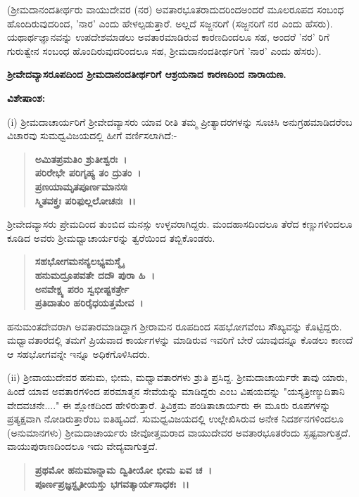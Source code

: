 (ಶ‍್ರೀಮದಾನಂದತೀರ್ಥರು ವಾಯುದೇವರ (ನರ) ಅವತಾರಭೂತರಾದುದರಿಂದ\break ಅಂದರೆ ಮೂಲರೂಪದ ಸಂಬಂಧ ಹೊಂದಿರುವುದರಿಂದ, 'ನಾರ' ಎಂದು ಹೇಳಲ್ಪಡುತ್ತಾರೆ. ಅಲ್ಲದೆ ಸಜ್ಜನರಿಗೆ (ಸಜ್ಜನರಿಗೆ ನರ ಎಂದು ಹೆಸರು). ಯಥಾರ್ಥಜ್ಞಾನವನ್ನು ಉಪದೇಶಮಾಡಲು ಅವತಾರಮಾಡಿರುವ ಕಾರಣದಿಂದಲೂ ಸಹ, ಅಂದರೆ 'ನರ' ರಿಗೆ ಗುರುತ್ವೇನ ಸಂಬಂಧ ಹೊಂದಿರುವುದರಿಂದಲೂ ಸಹ, ಶ‍್ರೀಮದಾನಂದತೀರ್ಥರಿಗೆ 'ನಾರ' ಎಂದು ಹೆಸರು).

\begin{center}
\textbf{ಶ‍್ರೀವೇದವ್ಯಾಸರೂಪದಿಂದ ಶ‍್ರೀಮದಾನಂದತೀರ್ಥರಿಗೆ ಆಶ್ರಯನಾದ ಕಾರಣದಿಂದ ನಾರಾಯಣ.}
\end{center}

\noindent
\textbf{ವಿಶೇಷಾಂಶ:\enginline{-}}

(i) ಶ‍್ರೀಮದಾಚಾರ್ಯರಿಗೆ ಶ‍್ರೀವೇದವ್ಯಾಸರು ಯಾವ ರೀತಿ ತಮ್ಮ ಪ್ರೀತ್ಯಾದರಗಳನ್ನು ಸೂಚಿಸಿ ಅನುಗ್ರಹಮಾಡಿದರೆಂಬ ವಿಚಾರವು ಸುಮಧ್ವವಿಜಯದಲ್ಲಿ ಹೀಗೆ ವರ್ಣಿಸಲಾಗಿದೆ:-

\begin{verse}
\textbf{ಅಮಿತಪ್ರಮತಿಂ ಶ್ರುತೀಶ್ವರಃ~।}\\\textbf{ಪರಿರೇಭೇ ಪರಿಗೃಹ್ಯ ತಂ ದ್ರುತಂ~।}\\\textbf{ಪ್ರಣಯಾಮೃತಪೂರ್ಣಮಾನಸಃ}\\\textbf{ಸ್ಮಿತವಕ್ತ್ರಃ ಪರಿಫುಲ್ಲಲೋಚನಃ~।।}
\end{verse}

ಶ‍್ರೀವೇದವ್ಯಾಸರು ಪ್ರೇಮದಿಂದ ತುಂಬಿದ ಮನಸ್ಸು ಉಳ್ಳವರಾಗಿದ್ದರು. ಮಂದಹಾಸದಿಂದಲೂ ತೆರೆದ ಕಣ್ಣುಗಳಿಂದಲೂ ಕೂಡಿದ ಅವರು ಶ‍್ರೀಮಧ್ವಾಚಾರ್ಯರನ್ನು ತ್ವರೆಯಿಂದ ತಬ್ಬಿಕೊಂಡರು.

\begin{verse}
\textbf{ಸಹಭೋಗಮನನ್ಯಲಭ್ಯಮಸ್ಮೈ}\\\textbf{ಹನುಮದ್ರೂಪವತೇ ದದೌ ಪುರಾ ಹಿ~।}\\\textbf{ಅನವೇಕ್ಷ್ಯ ಪರಂ ಸ್ವಭೀಷ್ಟಕರ್ತ್ರೇ}\\\textbf{ಪ್ರತಿದಾತುಂ ಹರಿರೈಧಯತ್ತಮೇವ~।}
\end{verse}

ಹನುಮಂತದೇವರಾಗಿ ಅವತಾರಮಾಡಿದ್ದಾಗ ಶ‍್ರೀರಾಮನ ರೂಪದಿಂದ ಸಹಭೋಗವೆಂಬ ಸೌಖ್ಯವನ್ನು ಕೊಟ್ಟಿದ್ದರು. ಮಧ್ವಾವತಾರದಲ್ಲಿ ತಮಗೆ ಪ್ರಿಯವಾದ ಕಾರ್ಯಗಳನ್ನು ಮಾಡಿರುವ ಇವರಿಗೆ ಬೇರೆ ಯಾವುದನ್ನೂ ಕೊಡಲು ಕಾಣದೆ ಆ ಸಹಭೋಗವನ್ನೇ ಇನ್ನೂ ಅಧಿಕಗೊಳಿಸಿದರು.

(ii) ಶ‍್ರೀವಾಯುದೇವರ ಹನುಮ, ಭೀಮ, ಮಧ್ವಾವತಾರಗಳು ಶ್ರುತಿ ಪ್ರಸಿದ್ದ. ಶ‍್ರೀಮದಾಚಾರ್ಯರೇ ತಾವು ಯಾರು, ಹಿಂದೆ ಯಾವ ಅವತಾರಗಳಿಂದ ಪರಮಾತ್ಮನ ಸೇವೆಯನ್ನು ಮಾಡಿದ್ದರು ಎಂಬ ವಿಷಯವನ್ನು "ಯಸ್ಯತ್ರೀಣ್ಯುದಿತಾನಿ ವೇದವಚನೇ...." ಈ ಶ್ಲೋಕದಿಂದ ಹೇಳಿರುತ್ತಾರೆ. ತ್ರಿವಿಕ್ರಮ ಪಂಡಿತಾಚಾರ್ಯರು ಈ ಮೂರು ರೂಪಗಳನ್ನು ಪ್ರತ್ಯಕ್ಷವಾಗಿ ನೋಡಿರುತ್ತಾರೆಂಬ ಐತಿಹ್ಯವಿದೆ. ಸುಮಧ್ವವಿಜಯದಲ್ಲಿ ಉಲ್ಲೇಖಿಸಿರುವ ಅನೇಕ ನಿದರ್ಶನಗಳಿಂದಲೂ (ಅನುಮಾನಗಳು) ಶ‍್ರೀಮದಾಚಾರ್ಯರು ಜೀವೋತ್ತಮರಾದ ವಾಯುದೇವರ ಅವತಾರಭೂತರೆಂದು ಸ್ಪಷ್ಟವಾಗುತ್ತದೆ. ವಾಯುಪುರಾಣದಿಂದಲೂ ಇದು ವೇದ್ಯವಾಗುತ್ತದೆ.

\begin{verse}
\textbf{ಪ್ರಥಮೋ ಹನುಮಾನ್ನಾಮ ದ್ವಿತೀಯೋ ಭೀಮ ಏವ ಚ~।}\\\textbf{ಪೂರ್ಣಪ್ರಜ್ಞಸ್ಟೃತೀಯಸ್ತು ಭಗವತ್ಕಾರ್ಯಸಾಧಕಃ~।।}
\end{verse}

